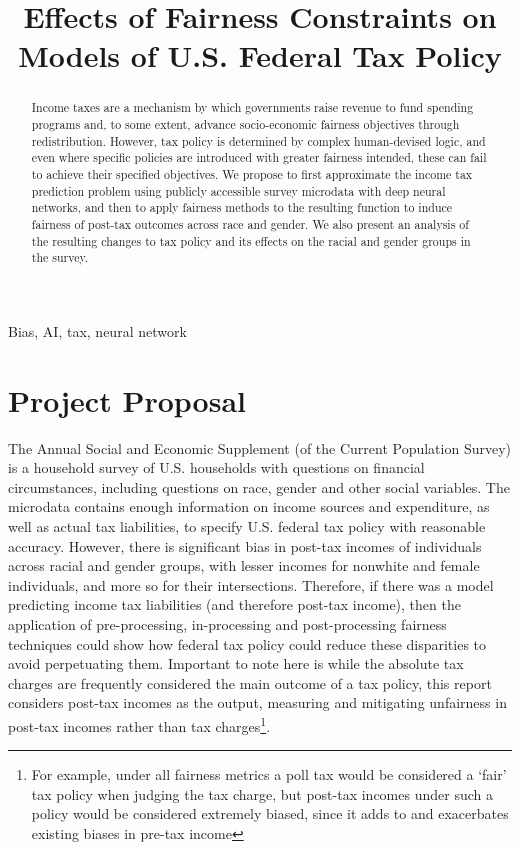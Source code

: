 \documentclass[conference]{IEEEtran}
\begin{document}
\title{Effects of Fairness Constraints on Models of U.S. Federal Tax Policy}

\author{
}

\maketitle

\begin{abstract}
Income taxes are a mechanism by which governments raise revenue to fund spending programs and, to some extent, advance socio-economic fairness objectives through redistribution. However, tax policy is determined by complex human-devised logic, and even where specific policies are introduced with greater fairness intended, these can fail to achieve their specified objectives. We propose to first approximate the income tax prediction problem using publicly accessible survey microdata with deep neural networks, and then to apply fairness methods to the resulting function to induce fairness of post-tax outcomes across race and gender. We also present an analysis of the resulting changes to tax policy and its effects on the racial and gender groups in the survey.
\end{abstract}

\begin{IEEEkeywords}
Bias, AI, tax, neural network
\end{IEEEkeywords}

\section{Project Proposal}
The Annual Social and Economic Supplement (of the Current Population Survey) is a household survey of U.S. households with questions on financial circumstances, including questions on race, gender and other social variables. The microdata contains enough information on income sources and expenditure, as well as actual tax liabilities, to specify U.S. federal tax policy with reasonable accuracy. However, there is significant bias in post-tax incomes of individuals across racial and gender groups, with lesser incomes for nonwhite and female individuals, and more so for their intersections. Therefore, if there was a model predicting income tax liabilities (and therefore post-tax income), then the application of pre-processing, in-processing and post-processing fairness techniques could show how federal tax policy could reduce these disparities to avoid perpetuating them. Important to note here is while the absolute tax charges are frequently considered the main outcome of a tax policy, this report considers post-tax incomes as the output, measuring and mitigating unfairness in post-tax incomes rather than tax charges\footnote{For example, under all fairness metrics a poll tax would be considered a `fair' tax policy when judging the tax charge, but post-tax incomes under such a policy would be considered extremely biased, since it adds to and exacerbates existing biases in pre-tax income}.
\end{document}
